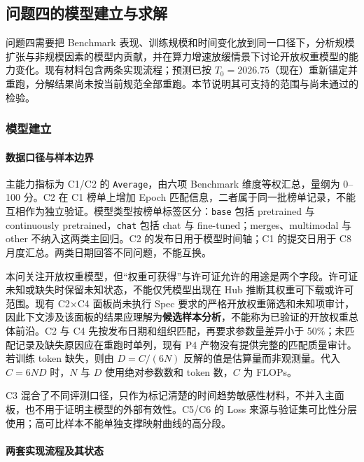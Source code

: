\subsection{问题四的模型建立与求解}
\label{sec:5.5}

问题四需要把 Benchmark 表现、训练规模和时间变化放到同一口径下，分析规模扩张与非规模因素的模型内贡献，并在算力增速放缓情景下讨论开放权重模型的能力变化。现有材料包含两条实现流程；预测已按 $T_0=2026.75$（现在）重新锚定并重跑，分解结果尚未按当前规范全部重跑。本节说明其可支持的范围与尚未通过的检验。

\subsubsection{模型建立}
\label{sec:5.5.1}

\paragraph{数据口径与样本边界}

主能力指标为 C1/C2 的 \texttt{Average}，由六项 Benchmark 维度等权汇总，量纲为 0--100 分。C2 在 C1 榜单上增加 Epoch 匹配信息，二者属于同一批榜单记录，不能互相作为独立验证。模型类型按榜单标签区分：\texttt{base} 包括 pretrained 与 continuously pretrained，\texttt{chat} 包括 chat 与 fine-tuned；merges、multimodal 与 other 不纳入这两类主回归。C2 的发布日用于模型时间轴；C1 的提交日用于 C8 月度汇总。两类日期回答不同问题，不能互换。

本问关注开放权重模型，但“权重可获得”与许可证允许的用途是两个字段。许可证未知或缺失时保留未知状态，不能仅凭模型出现在 Hub 推断其权重可下载或许可范围。现有 C2$\times$C4 面板尚未执行 Spec 要求的严格开放权重筛选和未知项审计，因此下文涉及该面板的结果应理解为\textbf{候选样本分析}，不能称为已验证的开放权重总体前沿。C2 与 C4 先按发布日期和组织匹配，再要求参数量差异小于 50\%；未匹配记录及缺失原因应在重跑时单列，现有 P4 产物没有提供完整的匹配质量审计。若训练 token 缺失，则由 $D=C/(6N)$ 反解的值是估算量而非观测量。代入 $C=6ND$ 时，$N$ 与 $D$ 使用绝对参数数和 token 数，$C$ 为 FLOPs。

C3 混合了不同评测口径，只作为标记清楚的时间趋势敏感性材料，不并入主面板，也不用于证明主模型的外部有效性。C5/C6 的 Loss 来源与验证集可比性分层使用；高可比样本不能单独支撑映射曲线的高分段。

\paragraph{两套实现流程及其状态}

